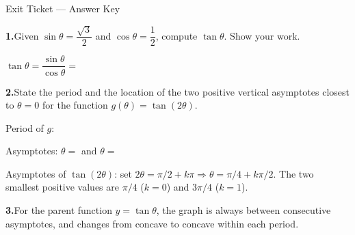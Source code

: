 \documentclass[10pt]{article}
\begin{document}
\namedateperiod

\vspace{0.10in}

\begin{notesbox}{Exit Ticket --- Answer Key}

\textbf{1.}\quad Given $\sin\theta = \dfrac{\sqrt{3}}{2}$ and $\cos\theta = \dfrac{1}{2}$,
compute $\tan\theta$.  Show your work.

\vspace{4pt}
$\tan\theta = \dfrac{\sin\theta}{\cos\theta} = $ 

\vspace{0.14in}
\textbf{2.}\quad State the period and the location of the two positive vertical
asymptotes closest to $\theta = 0$ for the function $g(\theta) = \tan(2\theta)$.

\vspace{4pt}
Period of $g$: 

\vspace{4pt}
Asymptotes: $\theta = $  and $\theta = $ 

\begin{teachernote}
Asymptotes of $\tan(2\theta)$: set $2\theta = \pi/2 + k\pi \Rightarrow \theta = \pi/4 + k\pi/2$.
The two smallest positive values are $\pi/4$ ($k=0$) and $3\pi/4$ ($k=1$).
\end{teachernote}

\vspace{0.14in}
\textbf{3.}\quad For the parent function $y = \tan\theta$, the graph is always
 between consecutive
asymptotes, and changes from concave  to concave
 within each period.

\end{notesbox}
\end{document}
